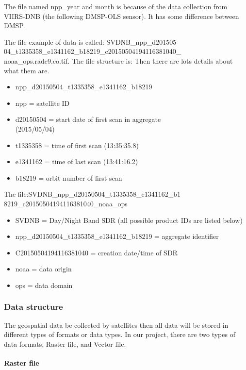 \documentclass[conference]{IEEEtran}
\begin{document}
The file named npp\_year and month is because of the data collection from VIIRS-DNB (the following DMSP-OLS sensor). 
It has some difference between DMSP.

The file example of data is called: SVDNB\_npp\_d201505\\04\_t1335358\_e1341162\_b18219\_c20150504194116381040\_\\noaa\_ops.rade9.co.tif. 
The file structure is:
Then there are lots details about what them are.
\begin{itemize}
    \item npp\_d20150504\_t1335358\_e1341162\_b18219
    \item npp = satellite ID
    \item d20150504 = start date of first scan in aggregate \\
    (2015/05/04)
    \item t1335358 = time of first scan (13:35:35.8)
    \item e1341162 = time of last scan (13:41:16.2)
    \item b18219 = orbit number of first scan
\end{itemize} 

The file:SVDNB\_npp\_d20150504\_t1335358\_e1341162\_b1\\
8219\_c20150504194116381040\_noaa\_ops

\begin{itemize}
    \item SVDNB = Day/Night Band SDR (all possible product IDs are listed below)
    \item npp\_d20150504\_t1335358\_e1341162\_b18219 = aggregate identifier
    \item C20150504194116381040 = creation date/time of SDR
    \item noaa = data origin
    \item ops = data domain
\end{itemize}

\subsubsection{Data structure}

The geospatial data be collected by satellites then all data will be stored in different types of formats or data types. 
In our project, there are two types of data formats, Raster file, and Vector file.

\paragraph{Raster file} 
\end{document}

